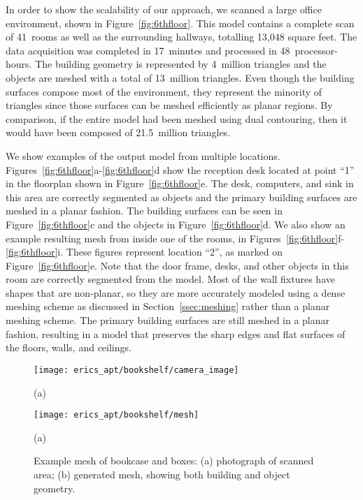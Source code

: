 \documentclass[review]{acmsiggraph}
\begin{document}
In order to show the scalability of our approach, we scanned a large office environment, shown in Figure~\ref{fig:6thfloor}.  This model contains a complete scan of 41~rooms as well as the surrounding hallways, totalling 13,048 square feet.  The data acquisition was completed in 17~minutes and processed in 48~processor-hours.  The building geometry is represented by 4~million triangles and the objects are meshed with a total of 13~million triangles.  Even though the building surfaces compose most of the environment, they represent the minority of triangles since those surfaces can be meshed efficiently as planar regions.  By comparison, if the entire model had been meshed using dual contouring, then it would have been composed of 21.5~million triangles.

We show examples of the output model from multiple locations.  Figures~\ref{fig:6thfloor}a-\ref{fig:6thfloor}d show the reception desk located at point ``1'' in the floorplan shown in Figure~\ref{fig:6thfloor}e.  The desk, computers, and sink in this area are correctly segmented as objects and the primary building surfaces are meshed in a planar fashion.  The building surfaces can be seen in Figure~\ref{fig:6thfloor}c and the objects in Figure~\ref{fig:6thfloor}d.  We also show an example resulting mesh from inside one of the rooms, in Figures~\ref{fig:6thfloor}f-\ref{fig:6thfloor}i.  These figures represent location ``2'', as marked on Figure~\ref{fig:6thfloor}e.  Note that the door frame, desks, and other objects in this room are correctly segmented from the model.  Most of the wall fixtures have shapes that are non-planar, so they are more accurately modeled using a dense meshing scheme as discussed in Section~\ref{ssec:meshing} rather than a planar meshing scheme.  The primary building surfaces are still meshed in a planar fashion, resulting in a model that preserves the sharp edges and flat surfaces of the floors, walls, and ceilings.

\begin{figure}[t]

	\begin{minipage}[t]{0.9\linewidth}
		\centerline{\texttt{[image: erics\_apt/bookshelf/camera\_image]}}
		\centerline{(a)}
	\end{minipage}

	\begin{minipage}[t]{0.9\linewidth}
		\centerline{\texttt{[image: erics\_apt/bookshelf/mesh]}}
		\centerline{(a)}
	\end{minipage}
	
	\caption{Example mesh of bookcase and boxes: (a) photograph of scanned area; (b) generated mesh, showing both building and object geometry.}
	\label{fig:bookcase}
\end{figure}
\end{document}
